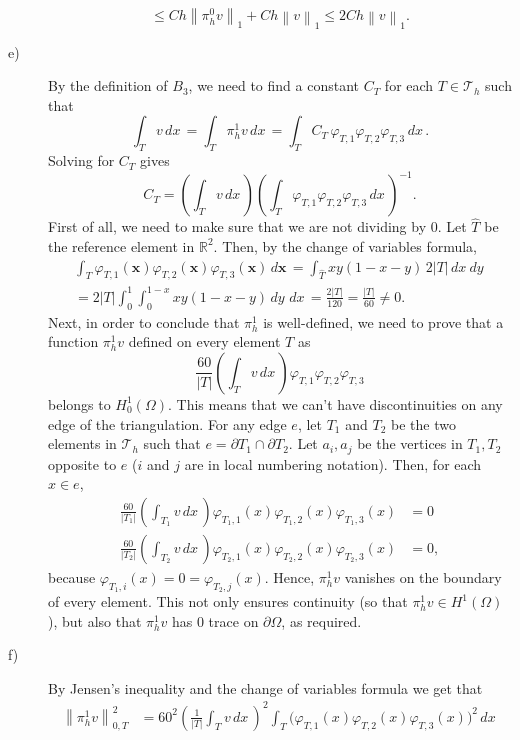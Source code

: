 \documentclass[a4paper]{article}
\renewcommand{\vec}[1]{\mathbf{#1}}
\newcommand{\dx}{\, dx \,}
\newcommand{\dy}{\, dy \,}
\newcommand{\dxy}{\, dx \:\! dy \,}
\newcommand{\area}[1]{\left\lvert #1 \right\rvert}
\newcommand{\norm}[1]{\left\lVert #1 \right\rVert}
\newcommand{\R}{\mathbb{R}}
\begin{document}
\begin{description}
\[	\leq C h \norm{\pi_h^0v}_1 + C h \norm{v}_1
	\leq 2C h \norm{v}_1.
	\]
\item[e)] By the definition of $B_3$, we need to find a constant $C_T$ for each
	$T \in \mathcal{T}_h$ such that
	\[
	\int_T v \dx
	= \int_T \pi_h^1v \dx
	= \int_T C_T \, \varphi_{T,1} \varphi_{T,2} \varphi_{T,3} \dx.
	\]
	Solving for $C_T$ gives
	\[
	C_T = \left( \int_T v \dx \right)
	      \left( \int_T \varphi_{T,1} \varphi_{T,2} \varphi_{T,3} \dx \right)^{-1}.
	\]
	First of all, we need to make sure that we are not dividing by 0.
	Let $\hat{T}$ be the reference element in $\R^2$. Then, by the change
	of variables formula,
	\begin{gather*}
	\int_T \varphi_{T,1}(\vec{x}) \varphi_{T,2}(\vec{x})
	       \varphi_{T,3}(\vec{x}) \, d\vec{x} \,
	= \int_{\hat{T}} xy(1-x-y) \, 2 \area{T} \! \dxy \\
	= 2 \area{T} \int_0^1 \int_0^{1-x} xy(1-x-y) \dy \dx
	= \frac{2\area{T}}{120}
	= \frac{\area{T}}{60} \neq 0.
	\end{gather*}
	Next, in order to conclude that $\pi_h^1$ is well-defined, we need to
	prove that a function $\pi_h^1v$ defined on every element $T$ as
	\[
	\frac{60}{\area{T}} \left( \int_T v \dx \right)
	\varphi_{T,1} \varphi_{T,2} \varphi_{T,3}
	\]
	belongs to $H_0^1(\Omega)$. This means that we can't have discontinuities
	on any edge of the triangulation. For any edge $e$, let $T_1$ and $T_2$ be
	the two elements in $\mathcal{T}_h$ such that $e = \partial T_1 \cap \partial T_2$.
	Let $a_i, a_j$ be the vertices in $T_1, T_2$ opposite to $e$
	($i$ and $j$ are in local numbering notation).
	Then, for each $x \in e$,
	\begin{align*}
	\frac{60}{\area{T_1}} \left( \int_{T_1} v \dx \right)
	\varphi_{T_1,1}(x) \varphi_{T_1,2}(x) \varphi_{T_1,3}(x) &= 0 \\
	\frac{60}{\area{T_2}} \left( \int_{T_2} v \dx \right)
	\varphi_{T_2,1}(x) \varphi_{T_2,2}(x) \varphi_{T_2,3}(x) &= 0,
	\end{align*}
	because $\varphi_{T_1,i}(x) = 0 = \varphi_{T_2,j}(x)$.
	Hence, $\pi_h^1v$ vanishes on the boundary of every element.
	This not only ensures continuity (so that $\pi_h^1v \in H^1(\Omega)$),
	but also that $\pi_h^1v$ has 0 trace on $\partial\Omega$, as required.
\item[f)] By Jensen's inequality and the change of variables formula we get that
	\begin{align*}
	\norm{\pi_h^1v}_{0,T}^2
&	= 60^2 \left( \frac{1}{\area{T}} \int_{T} v \dx \right)^2
		\int_T \big( \varphi_{T,1}(x) \varphi_{T,2}(x) \varphi_{T,3}(x) \big)^2 \dx \\

\end{align*}
\end{description}
\end{document}
